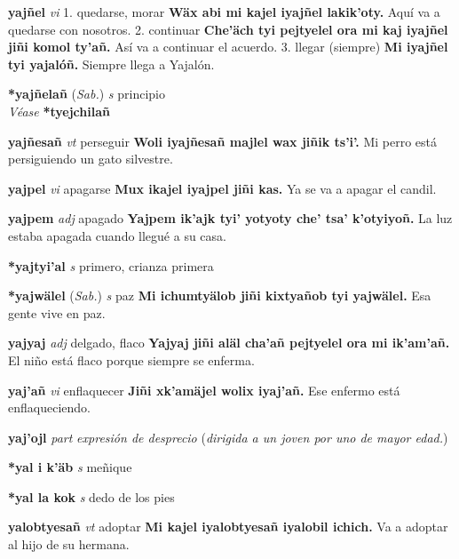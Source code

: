 \documentclass[10pt]{scrbook}
\newcommand{\entry}[1]{\textbf{#1}}
\newcommand{\onedefinition}[1]{#1.}
\newcommand{\nontranslationdef}[1]{\textit{#1}}
\newcommand{\partofspeech}[1]{\textit{#1}}
\newcommand{\spanishtranslation}[1]{#1}
\newcommand{\clarification}[1]{(\textit{#1})}
\newcommand{\cholexample}[1]{\textbf{#1}}
\newcommand{\exampletranslation}[1]{#1}
\newcommand{\alsosee}[1]{\\\textit{Véase} \textbf{#1}}
\newcommand{\relevantdialect}[1]{(\textit{#1})}
\begin{document}
\begin{multicols}{2}
\entry{yajñel}
\partofspeech{vi}
\onedefinition{1}
\spanishtranslation{quedarse, morar}
\cholexample{Wäx abi mi kajel iyajñel lakik'oty.}
\exampletranslation{Aquí va a quedarse con nosotros.}
\onedefinition{2}
\spanishtranslation{continuar}
\cholexample{Che'äch tyi pejtyelel ora mi kaj iyajñel jiñi komol ty'añ.}
\exampletranslation{Así va a continuar el acuerdo.}
\onedefinition{3}
\spanishtranslation{llegar (siempre)}
\cholexample{Mi iyajñel tyi yajalóñ.}
\exampletranslation{Siempre llega a Yajalón.}

\entry{*yajñelañ}
\relevantdialect{Sab.}
\partofspeech{s}
\spanishtranslation{principio}
\alsosee{*tyejchilañ}

\entry{yajñesañ}
\partofspeech{vt}
\spanishtranslation{perseguir}
\cholexample{Woli iyajñesañ majlel wax jiñik ts'i'.}
\exampletranslation{Mi perro está persiguiendo un gato silvestre.}

\entry{yajpel}
\partofspeech{vi}
\spanishtranslation{apagarse}
\cholexample{Mux ikajel iyajpel jiñi kas.}
\exampletranslation{Ya se va a apagar el candil.}

\entry{yajpem}
\partofspeech{adj}
\spanishtranslation{apagado}
\cholexample{Yajpem ik'ajk tyi' yotyoty che' tsa' k'otyiyoñ.}
\exampletranslation{La luz estaba apagada cuando llegué a su casa.}

\entry{*yajtyi'al}
\partofspeech{s}
\spanishtranslation{primero, crianza primera}

\entry{*yajwälel}
\relevantdialect{Sab.}
\partofspeech{s}
\spanishtranslation{paz}
\cholexample{Mi ichumtyälob jiñi kixtyañob tyi yajwälel.}
\exampletranslation{Esa gente vive en paz.}

\entry{yajyaj}
\partofspeech{adj}
\spanishtranslation{delgado, flaco}
\cholexample{Yajyaj jiñi aläl cha'añ pejtyelel ora mi ik'am'añ.}
\exampletranslation{El niño está flaco porque siempre se enferma.}

\entry{yaj'añ}
\partofspeech{vi}
\spanishtranslation{enflaquecer}
\cholexample{Jiñi xk'amäjel wolix iyaj'añ.}
\exampletranslation{Ese enfermo está enflaqueciendo.}

\entry{yaj'ojl}
\partofspeech{part}
\nontranslationdef{expresión de desprecio}
\clarification{dirigida a un joven por uno de mayor edad.}

\entry{*yal i k'äb}
\partofspeech{s}
\spanishtranslation{meñique}

\entry{*yal la kok}
\partofspeech{s}
\spanishtranslation{dedo de los pies}

\entry{yalobtyesañ}
\partofspeech{vt}
\spanishtranslation{adoptar}
\cholexample{Mi kajel iyalobtyesañ iyalobil ichich.}
\exampletranslation{Va a adoptar al hijo de su hermana.}


\end{multicols}
\end{document}
